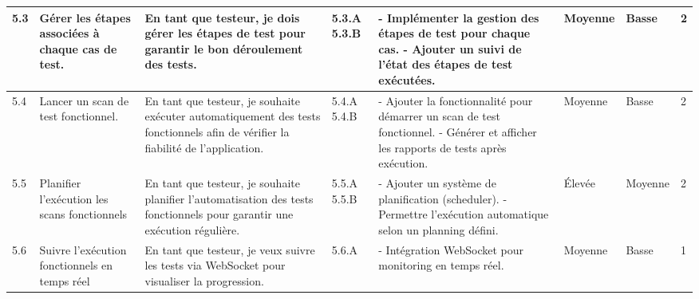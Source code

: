 \begin{landscape}
\begin{spacing}{0.98}
\begin{longtable}{|p{0.5cm}|p{3cm}|p{6cm}|p{0.9cm}|p{7.8cm}|p{0.6cm}|p{0.6cm}|p{1.2cm}|}
                5.3 & Gérer les étapes associées à chaque cas de test. 
                    & En tant que testeur, je dois gérer les étapes de test pour garantir le bon déroulement des tests. 
                    & 5.3.A \newline\vspace{0.5cm} 5.3.B
                    &
                    - Implémenter la gestion des étapes de test pour chaque cas. \newline
                    - Ajouter un suivi de l'état des étapes de test exécutées.
                    & Moyenne & Basse & 2 \\ \hline
                
                5.4 & Lancer un scan de test fonctionnel. 
                    & En tant que testeur, je souhaite exécuter automatiquement des tests fonctionnels afin de vérifier la fiabilité de l'application.
                    & 5.4.A \newline\vspace{0.5cm} 5.4.B
                    &
                    - Ajouter la fonctionnalité pour démarrer un scan de test fonctionnel. \newline
                    - Générer et afficher les rapports de tests après exécution.
                    & Moyenne & Basse & 2 \\ \hline
                \hline
                5.5 & Planifier l'exécution les scans fonctionnels
                    & En tant que testeur, je souhaite planifier l'automatisation des tests fonctionnels pour garantir une exécution régulière.
                    & 5.5.A \newline\vspace{0.5cm} 5.5.B 
                    & - Ajouter un système de planification (scheduler). \newline
                      - Permettre l'exécution automatique selon un planning défini.
                    & Élevée & Moyenne & 2 \\\hline
                
                5.6 & Suivre l'exécution fonctionnels en temps réel
                    & En tant que testeur, je veux suivre les tests via WebSocket pour visualiser la progression.
                    & 5.6.A 
                    & - Intégration WebSocket pour monitoring en temps réel.
                    & Moyenne & Basse & 1 \\\hline
                

\end{longtable}
\end{spacing}
\end{landscape}
